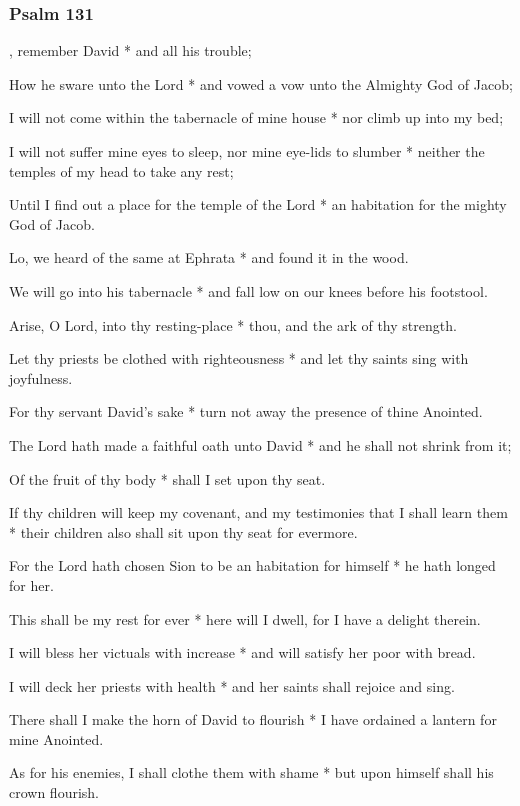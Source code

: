 \subsubsection{Psalm 131}


, remember David * and all his trouble;

How he sware unto the Lord * and vowed a vow unto the Almighty God of Jacob;

I will not come within the tabernacle of mine house * nor climb up into my bed;

I will not suffer mine eyes to sleep, nor mine eye-lids to slumber * neither the temples of my head to take any rest;

Until I find out a place for the temple of the Lord * an habitation for the mighty God of Jacob.

Lo, we heard of the same at Ephrata * and found it in the wood.

We will go into his tabernacle * and fall low on our knees before his footstool.

Arise, O Lord, into thy resting-place * thou, and the ark of thy strength.

Let thy priests be clothed with righteousness * and let thy saints sing with joyfulness.

For thy servant David's sake * turn not away the presence of thine Anointed.

The Lord hath made a faithful oath unto David * and he shall not shrink from it;

Of the fruit of thy body * shall I set upon thy seat.

If thy children will keep my covenant, and my testimonies that I shall learn them * their children also shall sit upon thy seat for evermore.

For the Lord hath chosen Sion to be an habitation for himself * he hath longed for her.

This shall be my rest for ever * here will I dwell, for I have a delight therein.

I will bless her victuals with increase * and will satisfy her poor with bread.

I will deck her priests with health * and her saints shall rejoice and sing.

There shall I make the horn of David to flourish * I have ordained a lantern for mine Anointed.

As for his enemies, I shall clothe them with shame * but upon himself shall his crown flourish.

